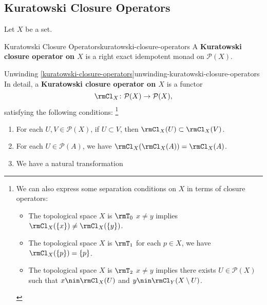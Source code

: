 \subsection{Kuratowski Closure Operators}\label{subsection-kuratowski-closure-operators}
Let $X$ be a set.
\begin{definition}{Kuratowski Closure Operators}{kuratowski-closure-operators}%
    A \textbf{Kuratowski closure operator on $X$} is a right exact idempotent monad on $\mathcal{P}(X)$.
\end{definition}
\begin{remark}{Unwinding \cref{kuratowski-closure-operators}}{unwinding-kuratowski-closure-operators}%
    In detail, a \textbf{Kuratowski closure operator on $X$} is a functor
    \[
        \rmCl_{X}%
        \colon%
        \mathcal{P}(X)%
        \to%
        \mathcal{P}(X),%
    \]%
    satisfying the following conditions:%
    \footnote{%
        We can also express some separation conditions on $X$ in terms of closure operators:
        \begin{itemize}
            \item The topological space $X$ is $\rmT_{0}$ \textiff $x\neq y$ implies $\rmCl_{X}(\{x\})\neq\rmCl_{X}(\{y\})$.
            \item The topological space $X$ is $\rmT_{1}$ \textiff for each $p\in X$, we have $\rmCl_{X}(\{p\})=\{p\}$.
            \item The topological space $X$ is $\rmT_{2}$ \textiff $x\neq y$ implies there exists $U\in\mathcal{P}(X)$ such that $x\nin\rmCl_{X}(U)$ and $y\nin\rmCl_{Y}(X\setminus U)$.
        \end{itemize}
        \par\vspace*{-2.0\baselineskip}
    }%
    \begin{enumerate}
        \item\label{unwinding-kuratowski-closure-operators-functoriality}For each $U,V\in\mathcal{P}(X)$, if $U\subset V$, then $\rmCl_{X}(U)\subset\rmCl_{X}(V)$.
        \item\label{unwinding-kuratowski-closure-operators-idempotency}For each $U\in\mathcal{P}(A)$, we have $\rmCl_{X}(\rmCl_{X}(A))=\rmCl_{X}(A)$.
        \item\label{unwinding-kuratowski-closure-operators-unitality}We have a natural transformation

\end{enumerate}
\end{remark}
